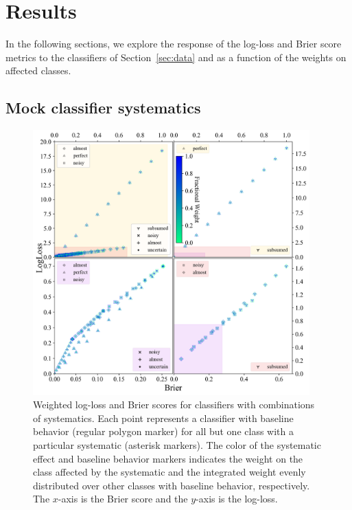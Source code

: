 \section{Results}
\label{sec:results}

In the following sections, we explore the response of the log-loss and Brier score metrics to the classifiers of Section~\ref{sec:data} and as a function of the weights on affected classes.

\subsection{Mock classifier systematics}
\label{sec:mockresults}

\begin{figure}
	\begin{center}
		\includegraphics[width=0.95\textwidth]{./fig/multipanel_res.png}
		\caption{Weighted log-loss and Brier scores for classifiers with combinations of systematics.
		Each point represents a classifier with baseline behavior (regular polygon marker) for all but one class with a particular systematic (asterisk markers).
		The color of the systematic effect and baseline behavior markers indicates the weight on the class affected by the systematic and the integrated weight evenly distributed over other classes with baseline behavior, respectively.
		The $x$-axis is the Brier score and the $y$-axis is the log-loss.
		}
	\end{center}
	\label{fig:all_combined}
\end{figure}

